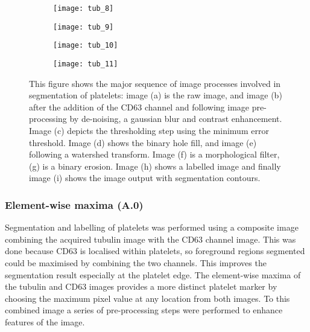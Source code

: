 \begin{figure}[htbp]
	\begin{subfigure}[b]{0.32\linewidth}
		\centering
		\texttt{[image: tub\_8]}
		\caption{}
		\label{figure:image_processing:platelet:tub_8}
		\vspace{1ex}
	\end{subfigure}
	\begin{subfigure}[b]{0.32\linewidth}
		\centering
		\texttt{[image: tub\_9]}
		\caption{}
		\label{figure:image_processing:platelet:tub_9}
		\vspace{1ex}
	\end{subfigure}
	\begin{subfigure}[b]{0.32\linewidth}
		\centering
		\texttt{[image: tub\_10]}
		\caption{}
		\label{figure:image_processing:platelet:tub_10}
		\vspace{1ex}
	\end{subfigure}
	\begin{subfigure}[b]{0.32\linewidth}
		\texttt{[image: tub\_11]}
		\caption{}
		\label{figure:image_processing:platelet:tub_11}
		\vspace{1ex}
	\end{subfigure}
\caption[Image processing for platelet segmentation]{This figure shows the  major sequence of image processes involved in segmentation of platelets: image (a) is the raw image, and image (b) after the addition of the CD63 channel and following image pre-processing by de-noising, a gaussian blur and contrast enhancement. Image (c) depicts the thresholding step using the minimum error threshold. Image (d) shows the binary hole fill, and image (e) following a watershed transform. Image (f) is a morphological filter, (g) is a binary erosion. Image (h) shows a labelled image and finally image (i) shows the image output with segmentation contours.}
\label{figure:image_processing:platelets}
\end{figure}

\subsubsection{Element-wise maxima (A.0)}
Segmentation and labelling of platelets was performed using a composite image combining the acquired tubulin image with the CD63 channel image. This was done because CD63 is localised within platelets, so foreground regions segmented could be maximised by combining the two channels. This improves the segmentation result especially at the platelet edge. The element-wise maxima of the tubulin and CD63 images provides a more distinct platelet marker by choosing the maximum pixel value at any location from both images. To this combined image a series of pre-processing steps were performed to enhance features of the image.

